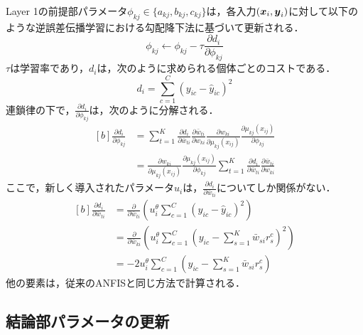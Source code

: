\documentclass{ujarticle}
\begin{document}
Layer 1の前提部パラメータ$\phi_{kj} \in \{ a_{kj}, b_{kj}, c_{kj} \}$は，各入力$(\mbox{\boldmath $x$}_i, \mbox{\boldmath $y$}_i)$に対して以下のような逆誤差伝播学習における勾配降下法に基づいて更新される．
%
\begin{equation}
	\phi_{kj} \leftarrow \phi_{kj} - \tau \frac{\partial d_i}{\partial \phi_{kj}}
\label{eq: premise parameters learning}
\end{equation}
%
$\tau$は学習率であり，$d_i$は，次のように求められる個体ごとのコストである．
%
\begin{equation}
	d_i = \sum_{c=1}^C (y_{ic} - \hat{y}_{ic})^2
\end{equation}
%
連鎖律の下で，$\frac{\partial d_i}{\partial \phi_{kj}}$は，次のように分解される．
%
\begin{equation}
\begin{aligned}[b]
\frac{\partial d_{i}}{\partial \phi_{k j}} &=\sum_{t=1}^{K} \frac{\partial d_{i}}{\partial \bar{w}_{t i}} \frac{\partial \bar{w}_{t i}}{\partial w_{k i}} \frac{\partial w_{k i}}{\partial \mu_{k j}\left(x_{i j}\right)} \frac{\partial \mu_{k j}\left(x_{i j}\right)}{\partial \phi_{k j}} \\
&=\frac{\partial w_{k i}}{\partial \mu_{k j}\left(x_{i j}\right)} \frac{\partial \mu_{k j}\left(x_{i j}\right)}{\partial \phi_{k j}} \sum_{t=1}^{K} \frac{\partial d_{i}}{\partial \bar{w}_{t i}} \frac{\partial \bar{w}_{t i}}{\partial w_{k i}}
\end{aligned}
\end{equation}
%
ここで，新しく導入されたパラメータ$u_i$は，$\frac{\partial d_i}{\partial \bar{w}_{ti}}$についてしか関係がない．
%
\begin{equation}
\begin{aligned}[b]
\frac{\partial d_{i}}{\partial \bar{w}_{t i}} &=\frac{\partial}{\partial \bar{w}_{t i}}\left(u_{i}^{\theta} \sum_{c=1}^{C}\left(y_{i c}-\hat{y}_{i c}\right)^{2}\right) \\
&=\frac{\partial}{\partial \bar{w}_{k i}}\left(u_{i}^{\theta} \sum_{c=1}^{C}\left(y_{i c}-\sum_{s=1}^{K} \bar{w}_{s i} r_{s}^{c}\right)^{2}\right) \\
&=-2 u_{i}^{\theta} \sum_{c=1}^{C}\left(y_{i c}-\sum_{s=1}^{K} \bar{w}_{s i} r_{s}^{c}\right)
\end{aligned}
\end{equation}
%
他の要素は，従来のANFISと同じ方法で計算される．

\subsection{結論部パラメータの更新}
\end{document}
